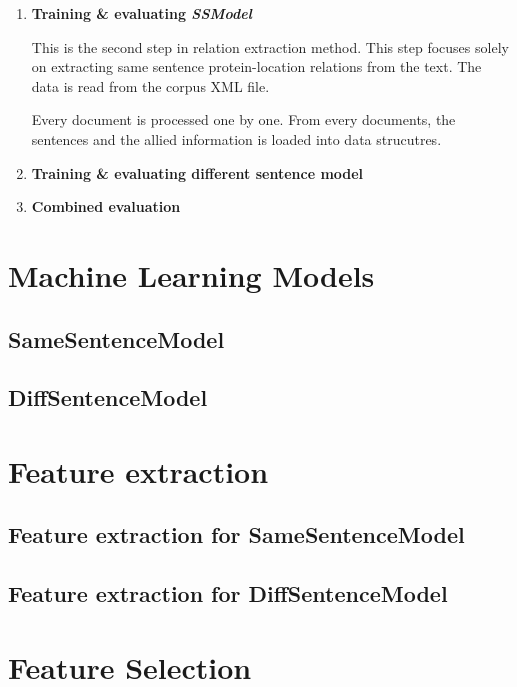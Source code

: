 \begin{enumerate}
\item \textbf{Training \& evaluating \textit{SSModel}}

This is the second step in relation extraction method. This step focuses solely on extracting same sentence protein-location relations from the text. The data is read from the corpus XML file. 

Every document is processed one by one. From every documents, the sentences and the allied information is loaded into data strucutres.

\item \textbf{Training \& evaluating different sentence model}

\item \textbf{Combined evaluation}

\end{enumerate}

\section{Machine Learning Models}\label{sec:models}

\subsection{SameSentenceModel}

\subsection{DiffSentenceModel}


\section{Feature extraction}\label{sec:featExp}

\subsection{Feature extraction for SameSentenceModel}

\subsection{Feature extraction for DiffSentenceModel}

\section{Feature Selection}\label{sec:featSel}

